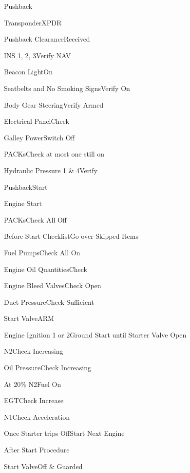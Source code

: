 \documentclass[sim-use, blue_items]{checklist}
\begin{document}
\begin{checklist}{Pushback}
	\item{Transponder}{XPDR}
	\item{Pushback Clearance}{Received}
	\item{INS 1, 2, 3}{Verify NAV}
	\item{Beacon Light}{On}
	\item{Seatbelts and No Smoking Signs}{Verify On}
	\item{Body Gear Steering}{Verify Armed}
	\item{Electrical Panel}{Check}
	\item{Galley Power}{Switch Off}
	\item{PACKs}{Check at most one still on}
	\item{Hydraulic Pressure 1 \& 4}{Verify}
	\item{Pushback}{Start}
\end{checklist}

\begin{checklist}{Engine Start}
	\item{PACKs}{Check All Off}
	\item{Before Start Checklist}{Go over Skipped Items}
	\item{Fuel Pumps}{Check All On}
	\item{Engine Oil Quantities}{Check}
	\item{Engine Bleed Valves}{Check Open}
	\item{Duct Pressure}{Check Sufficient}
	\item{Start Valve}{ARM}
	 {
		\item{Engine Ignition 1 or 2}{Ground Start until Starter Valve Open}
		\item{N2}{Check Increasing}
		\item{Oil Pressure}{Check Increasing}
		\item{At 20\% N2}{Fuel On}
		\item{EGT}{Check Increase}
		\item{N1}{Check Acceleration}
		\item{Once Starter trips Off}{Start Next Engine}
	}
\end{checklist}

\begin{checklist}{After Start Procedure}
	\item{Start Valve}{Off \& Guarded}
\end{checklist}
\end{document}
